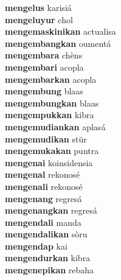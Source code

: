 \textbf{mengelus } karisiá \\
\textbf{mengeluyur } chol \\
\textbf{mengemaskinikan } actualisa \\
\textbf{mengembangkan } oumentá \\
\textbf{mengembara } chèns \\
\textbf{mengembari } acopla \\
\textbf{mengembarkan } acopla \\
\textbf{mengembung } blaas \\
\textbf{mengembungkan } blaas \\
\textbf{mengempukkan } kibra \\
\textbf{mengemudiankan } aplasá \\
\textbf{mengemudikan } stür \\
\textbf{mengemukakan } puntra \\
\textbf{mengenai } koinsidensia \\
\textbf{mengenal } rekonosé \\
\textbf{mengenali } rekonosé \\
\textbf{mengenang } regresá \\
\textbf{mengenangkan } regresá \\
\textbf{mengendali } manda \\
\textbf{mengendalikan } sòru \\
\textbf{mengendap } kai \\
\textbf{mengendurkan } kibra \\
\textbf{mengenepikan } rebaha \\
